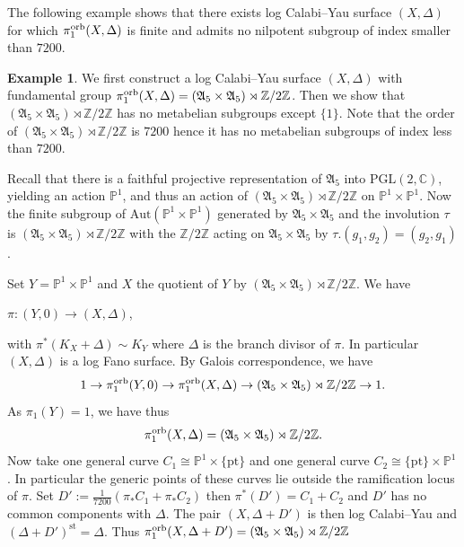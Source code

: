 \documentclass{amsart}
\theoremstyle{definition}
\newtheorem{example}[theorem]{Example}
\theoremstyle{remark}
\numberwithin{equation}{section}
\begin{document}
The following example shows that there exists log Calabi--Yau surface $(X,\Delta)$ for which $\pi_1^{\rm orb}(X,\Delta)$ is finite and admits no nilpotent subgroup of index smaller than $7200$.

\begin{example}\label{ex:quotient-p1xp1}
We first construct a log Calabi--Yau surface $(X,\Delta)$ with fundamental group $\pi_1^{\rm orb}(X,\Delta)=(\mathfrak{A}_5\times \mathfrak{A}_5)\rtimes \mathbb{Z}/2\mathbb{Z}$. Then we show that $(\mathfrak{A}_5\times \mathfrak{A}_5)\rtimes \mathbb{Z}/2\mathbb{Z}$ has no metabelian subgroups except $\{1\}$. Note that the order of $(\mathfrak{A}_5\times \mathfrak{A}_5)\rtimes \mathbb{Z}/2\mathbb{Z}$ is $7200$ hence it has no metabelian subgroups of index less than $7200$.

Recall that there is a faithful projective representation of $\mathfrak{A}_5$ into $\mathrm{PGL}(2,\mathbb{C})$, yielding an action $\mathbb{P}^1$, and thus an action of $(\mathfrak{A}_5\times \mathfrak{A}_5)\rtimes \mathbb{Z}/2\mathbb{Z}$ on $\mathbb{P}^1\times \mathbb{P}^1$. Now the finite subgroup of $\mathrm{Aut}(\mathbb{P}^1\times \mathbb{P}^1)$  generated by $\mathfrak{A}_5\times \mathfrak{A}_5$ and the involution $\tau$ is $(\mathfrak{A}_5\times \mathfrak{A}_5)\rtimes \mathbb{Z}/2\mathbb{Z}$ with the $\mathbb{Z}/2\mathbb{Z}$ acting on $\mathfrak{A}_5\times \mathfrak{A}_5$ by $\tau.(g_1,g_2)=(g_2,g_1)$. 

Set $Y=\mathbb{P}^1\times \mathbb{P}^1$ and $X$ the quotient of $Y$ by $(\mathfrak{A}_5\times \mathfrak{A}_5)\rtimes \mathbb{Z}/2\mathbb{Z}$. We have 
\begin{center}
    $\pi:(Y,0)\rightarrow (X,\Delta)$,
\end{center}
with $\pi^{\ast}(K_X+\Delta)\sim K_Y$ where $\Delta$ is the branch divisor of $\pi$. In particular $(X,\Delta)$ is a log Fano surface. By Galois correspondence, 
we have
\begin{equation*}
    1\rightarrow \pi_1^{\rm orb}(Y,0)\rightarrow \pi_1^{\rm orb}(X,\Delta)\rightarrow (\mathfrak{A}_5\times \mathfrak{A}_5)\rtimes \mathbb{Z}/2\mathbb{Z}\rightarrow 1.
\end{equation*}
As $\pi_1(Y)=1$, we have thus 
\begin{equation*}
    \pi_1^{\rm orb}(X,\Delta)= (\mathfrak{A}_5\times \mathfrak{A}_5)\rtimes \mathbb{Z}/2\mathbb{Z}.
\end{equation*}
Now take one general curve $C_1 \cong \mathbb{P}^1\times \{\mathrm{pt}\}$ and one general curve $C_2\cong \{\mathrm{pt}\} \times \mathbb{P}^1$. In particular the generic points of these curves lie outside the ramification locus of $\pi$. Set $D':=\frac{1}{7200}( \pi_{\ast}C_1+\pi_{\ast}C_2)$ then $\pi^{\ast}(D')=C_1+C_2$ and $D'$ has no common components with $\Delta$. The pair $(X,\Delta+D')$ is then log Calabi--Yau and $(\Delta+D')^{\mathrm{st}}=\Delta$. Thus $\pi_1^{\rm orb}(X,\Delta+D')= (\mathfrak{A}_5\times \mathfrak{A}_5)\rtimes \mathbb{Z}/2\mathbb{Z}$


\end{example}
\end{document}
